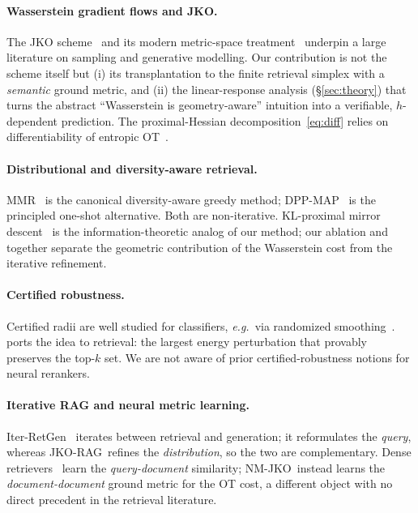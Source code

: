 \documentclass{article}
\theoremstyle{plain}
\newcommand{\jko}{\textsc{JKO-RAG}}
\newcommand{\nmjko}{\textsc{NM-JKO}}
\newcommand{\eg}{\textit{e.g.}}
\begin{document}
\paragraph{Wasserstein gradient flows and JKO.}
The JKO scheme~\cite{jko1998} and its modern metric-space treatment~\cite{ambrosio2008gradient,santambrogio2017euclidean} underpin a large literature on sampling and generative modelling. Our contribution is not the scheme itself but (i) its transplantation to the finite retrieval simplex with a \emph{semantic} ground metric, and (ii) the linear-response analysis (\S\ref{sec:theory}) that turns the abstract ``Wasserstein is geometry-aware'' intuition into a verifiable, $h$-dependent prediction. The proximal-Hessian decomposition~\eqref{eq:diff} relies on differentiability of entropic OT~\cite{luise2018differential,eisenberger2022unified,genevay2019}.

\paragraph{Distributional and diversity-aware retrieval.}
MMR~\cite{carbonell1998mmr} is the canonical diversity-aware greedy method; DPP-MAP~\cite{chen2018dpp} is the principled one-shot alternative. Both are non-iterative. KL-proximal mirror descent~\cite{beck2003mirror} is the information-theoretic analog of our method; our ablation and  together separate the geometric contribution of the Wasserstein cost from the iterative refinement.

\paragraph{Certified robustness.}
Certified radii are well studied for classifiers, \eg\ via randomized smoothing~\cite{cohen2019certified}.  ports the idea to retrieval: the largest energy perturbation that provably preserves the top-$k$ set. We are not aware of prior certified-robustness notions for neural rerankers.

\paragraph{Iterative RAG and neural metric learning.}
Iter-RetGen~\cite{shao2023iter} iterates between retrieval and generation; it reformulates the \emph{query}, whereas \jko\ refines the \emph{distribution}, so the two are complementary. Dense retrievers~\cite{karpukhin2020dpr,wang2023e5} learn the \emph{query-document} similarity; \nmjko\ instead learns the \emph{document-document} ground metric for the OT cost, a different object with no direct precedent in the retrieval literature.
\end{document}
